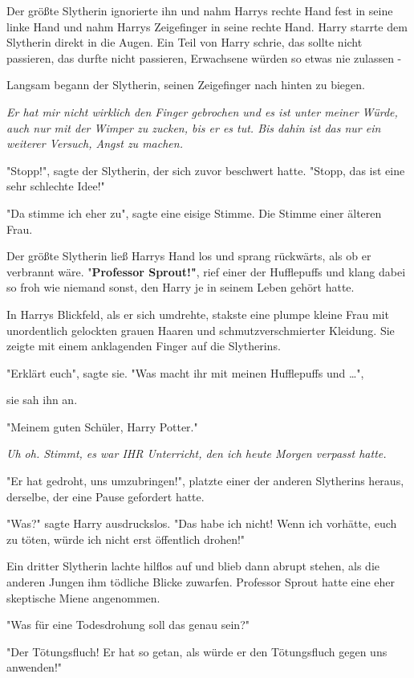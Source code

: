 {Der größte Slytherin ignorierte ihn und nahm Harrys rechte Hand fest in seine linke Hand und nahm Harrys Zeigefinger in seine rechte Hand. Harry starrte dem Slytherin direkt in die Augen. Ein Teil von Harry schrie, das sollte nicht passieren, das durfte nicht passieren, Erwachsene würden so etwas nie zulassen -

Langsam begann der Slytherin, seinen Zeigefinger nach hinten zu biegen.

\emph{Er hat mir nicht wirklich den Finger gebrochen und es ist unter meiner Würde, auch nur mit der Wimper zu zucken, bis er es tut. Bis dahin ist das nur ein weiterer Versuch, Angst zu machen.}

"Stopp!", sagte der Slytherin, der sich zuvor beschwert hatte. "Stopp, das ist eine sehr schlechte Idee!"

"Da stimme ich eher zu", sagte eine eisige Stimme. Die Stimme einer älteren Frau.

Der größte Slytherin ließ Harrys Hand los und sprang rückwärts, als ob er verbrannt wäre. "\textbf{Professor Sprout!"}, rief einer der Hufflepuffs und klang dabei so froh wie niemand sonst, den Harry je in seinem Leben gehört hatte.

In Harrys Blickfeld, als er sich umdrehte, stakste eine plumpe kleine Frau mit unordentlich gelockten grauen Haaren und schmutzverschmierter Kleidung. Sie zeigte mit einem anklagenden Finger auf die Slytherins.

"Erklärt euch", sagte sie. "Was macht ihr mit meinen Hufflepuffs und …",

sie sah ihn an.

"Meinem guten Schüler, Harry Potter."

\emph{Uh oh. Stimmt, es war IHR Unterricht, den ich heute Morgen verpasst hatte.}

"Er hat gedroht, uns umzubringen!", platzte einer der anderen Slytherins heraus, derselbe, der eine Pause gefordert hatte.

"Was?" sagte Harry ausdruckslos. "Das habe ich nicht! Wenn ich vorhätte, euch zu töten, würde ich nicht erst öffentlich drohen!"

Ein dritter Slytherin lachte hilflos auf und blieb dann abrupt stehen, als die anderen Jungen ihm tödliche Blicke zuwarfen. Professor Sprout hatte eine eher skeptische Miene angenommen.

"Was für eine Todesdrohung soll das genau sein?"

"Der Tötungsfluch! Er hat so getan, als würde er den Tötungsfluch gegen uns anwenden!"

}
